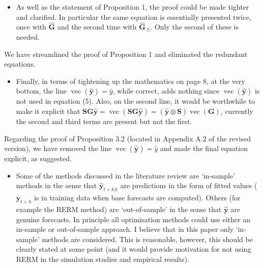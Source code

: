 \documentclass[11pt,a4paper,]{article}
\providecommand{\tightlist}{%
  \setlength{\itemsep}{0pt}\setlength{\parskip}{0pt}}
\renewenvironment{quote}
               {\list{}{\rightmargin\leftmargin}%
                \item\relax\color[RGB]{0,150,0}}
               {\endlist}
\begin{document}
\begin{itemize}
\tightlist
\item
  As well as the statement of Proposition 1, the proof could be made
  tighter and clarified. In particular the same equation is essentially
  presented twice, once with \(\hat{\bm{G}}\) and the second time with
  \(\hat{\bm{G}}_{\cdot \mathbb{S}}\). Only the second of these is
  needed.
\end{itemize}

\begin{quote}
We have streamlined the proof of Proposition 1 and eliminated the
redundant equations.
\end{quote}

\begin{itemize}
\tightlist
\item
  Finally, in terms of tightening up the mathematics on page 8, at the
  very bottom, the line \(\operatorname{vec}(\hat{\bm{y}})=\hat{y}\),
  while correct, adds nothing since \(\operatorname{vec}(\hat{\bm{y}})\)
  is not used in equation (5). Also, on the second line, it would be
  worthwhile to make it explicit that
  \(\bm{SG}\hat{\bm{y}}=\operatorname{vec}(\bm{SG}\hat{\bm{y}})=(\hat{\bm{y}} \otimes \bm{S}) \operatorname{vec}(\bm{G})\),
  currently the second and third terms are present but not the first.
\end{itemize}

\begin{quote}
Regarding the proof of Proposition 3.2 (located in Appendix A.2 of the
revised version), we have removed the line
\(\operatorname{vec}(\hat{\bm{y}})=\hat{y}\) and made the final equation
explicit, as suggested.
\end{quote}

\begin{itemize}
\tightlist
\item
  Some of the methods discussed in the literature review are `in-sample'
  methods in the sense that \(\hat{\bm{y}}_{t+h|t}\) are predictions in
  the form of fitted values (\(\bm{y}_{t+h}\) is in training data when
  base forecasts are computed). Others (for example the RERM method) are
  `out-of-sample' in the sense that \(\hat{\bm{y}}\) are genuine
  forecasts. In principle all optimisation methods could use either an
  in-sample or out-of-sample approach. I believe that in this paper only
  `in-sample' methods are considered. This is reasonable, however, this
  should be clearly stated at some point (and it would provide
  motivation for not using RERM in the simulation studies and empirical
  results).
\end{itemize}
\end{document}
